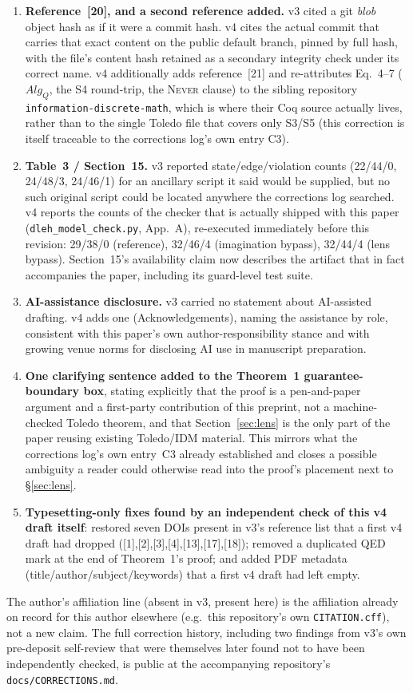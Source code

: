 \documentclass[10pt,twocolumn]{article}
\begin{document}
\begin{enumerate}[leftmargin=1.6em]
\item \textbf{Reference~[20], and a second reference added.} v3 cited a git \emph{blob} object hash as if it were a commit hash. v4 cites the actual commit that carries that exact content on the public default branch, pinned by full hash, with the file's content hash retained as a secondary integrity check under its correct name. v4 additionally adds reference~[21] and re-attributes Eq.~4--7 ($Alg_Q$, the S4 round-trip, the \textsc{Never} clause) to the sibling repository \texttt{information-discrete-math}, which is where their Coq source actually lives, rather than to the single Toledo file that covers only S3/S5 (this correction is itself traceable to the corrections log's own entry C3).
\item \textbf{Table~3 / Section~15.} v3 reported state/edge/violation counts (22/44/0, 24/48/3, 24/46/1) for an ancillary script it said would be supplied, but no such original script could be located anywhere the corrections log searched. v4 reports the counts of the checker that is actually shipped with this paper (\texttt{dleh\_model\_check.py}, App.~A), re-executed immediately before this revision: 29/38/0 (reference), 32/46/4 (imagination bypass), 32/44/4 (lens bypass). Section~15's availability claim now describes the artifact that in fact accompanies the paper, including its guard-level test suite.
\item \textbf{AI-assistance disclosure.} v3 carried no statement about AI-assisted drafting. v4 adds one (Acknowledgements), naming the assistance by role, consistent with this paper's own author-responsibility stance and with growing venue norms for disclosing AI use in manuscript preparation.
\item \textbf{One clarifying sentence added to the Theorem~1 guarantee-boundary box}, stating explicitly that the proof is a pen-and-paper argument and a first-party contribution of this preprint, not a machine-checked Toledo theorem, and that Section~\ref{sec:lens} is the only part of the paper reusing existing Toledo/IDM material. This mirrors what the corrections log's own entry~C3 already established and closes a possible ambiguity a reader could otherwise read into the proof's placement next to \S\ref{sec:lens}.
\item \textbf{Typesetting-only fixes found by an independent check of this v4 draft itself}: restored seven DOIs present in v3's reference list that a first v4 draft had dropped ([1],[2],[3],[4],[13],[17],[18]); removed a duplicated QED mark at the end of Theorem~1's proof; and added PDF metadata (title/author/subject/keywords) that a first v4 draft had left empty.
\end{enumerate}
The author's affiliation line (absent in v3, present here) is the affiliation already on record for this author elsewhere (e.g.\ this repository's own \texttt{CITATION.cff}), not a new claim. The full correction history, including two findings from v3's own pre-deposit self-review that were themselves later found not to have been independently checked, is public at the accompanying repository's \texttt{docs/CORRECTIONS.md}.
\end{document}
